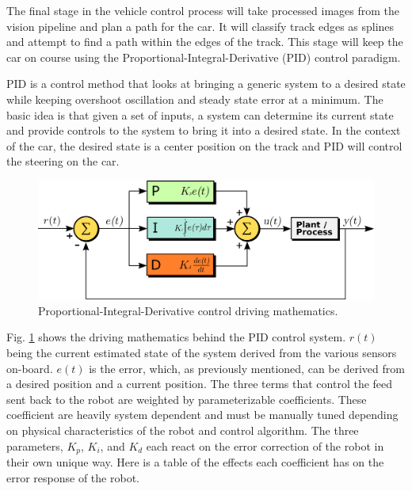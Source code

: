 \documentclass{article}
\begin{document}
The final stage in the vehicle control process will take processed images from the vision pipeline and plan a path for the car. It will classify track edges as splines and attempt to find a path within the edges of the track. This stage will keep the car on course using the Proportional-Integral-Derivative (PID) control paradigm.

PID is a control method that looks at bringing a generic system to a desired state while keeping overshoot oscillation and steady state error at a minimum. The basic idea is that given a set of inputs, a system can determine its current state and provide controls to the system to bring it into a desired state. In the context of the car, the desired state is a center position on the track and PID will control the steering on the car.

\begin{figure}[htb]
	\centering
	\centerline{\includegraphics[width=1.0\linewidth]{pid}}
	\caption{Proportional-Integral-Derivative control driving mathematics.}
	\label{fig:pid}
\end{figure}

Fig. \ref{fig:pid} shows the driving mathematics behind the PID control system. $r(t)$ being the current estimated state of the system derived from the various sensors on-board. $e(t)$ is the error, which, as previously mentioned, can be derived from a desired position and a current position. The three terms that control the feed sent back to the robot are weighted by parameterizable coefficients. These coefficient are heavily system dependent and must be manually tuned depending on physical characteristics of the robot and control algorithm. The three parameters, $K_p$, $K_i$, and $K_d$ each react on the error correction of the robot in their own unique way. Here is a table of the effects each coefficient has on the error response of the robot.
\end{document}
